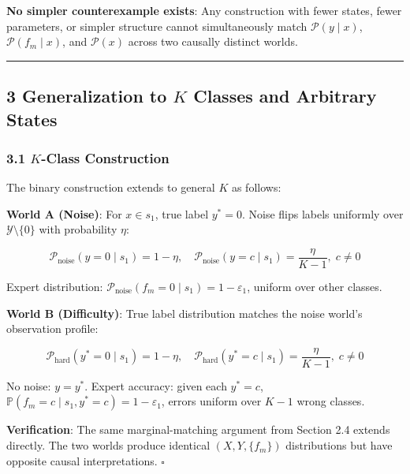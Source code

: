 \documentclass[
  12pt,
]{ctexart}
\begin{document}
\textbf{No simpler counterexample exists}: Any construction with fewer
states, fewer parameters, or simpler structure cannot simultaneously
match \(\mathcal{P}(y \mid x)\), \(\mathcal{P}(f_m \mid x)\), and
\(\mathcal{P}(x)\) across two causally distinct worlds.

\begin{center}\rule{0.5\linewidth}{0.5pt}\end{center}

\subsection{\texorpdfstring{3 Generalization to \(K\) Classes and
Arbitrary
States}{3 Generalization to K Classes and Arbitrary States}}\label{generalization-to-k-classes-and-arbitrary-states}

\subsubsection{\texorpdfstring{3.1 \(K\)-Class
Construction}{3.1 K-Class Construction}}\label{k-class-construction}

The binary construction extends to general \(K\) as follows:

\textbf{World A (Noise)}: For \(x \in s_1\), true label \(y^* = 0\).
Noise flips labels uniformly over \(\mathcal{Y} \setminus \{0\}\) with
probability \(\eta\):

\[\mathcal{P}_{\text{noise}}(y = 0 \mid s_1) = 1 - \eta, \quad \mathcal{P}_{\text{noise}}(y = c \mid s_1) = \frac{\eta}{K-1}, \; c \neq 0\]

Expert distribution:
\(\mathcal{P}_{\text{noise}}(f_m = 0 \mid s_1) = 1 - \varepsilon_1\),
uniform over other classes.

\textbf{World B (Difficulty)}: True label distribution matches the noise
world's observation profile:

\[\mathcal{P}_{\text{hard}}(y^* = 0 \mid s_1) = 1 - \eta, \quad \mathcal{P}_{\text{hard}}(y^* = c \mid s_1) = \frac{\eta}{K-1}, \; c \neq 0\]

No noise: \(y = y^*\). Expert accuracy: given each \(y^* = c\),
\(\mathbb{P}(f_m = c \mid s_1, y^* = c) = 1 - \varepsilon_1\), errors
uniform over \(K-1\) wrong classes.

\textbf{Verification}: The same marginal-matching argument from Section
2.4 extends directly. The two worlds produce identical
\((X, Y, \{f_m\})\) distributions but have opposite causal
interpretations. \(\square\)
\end{document}
